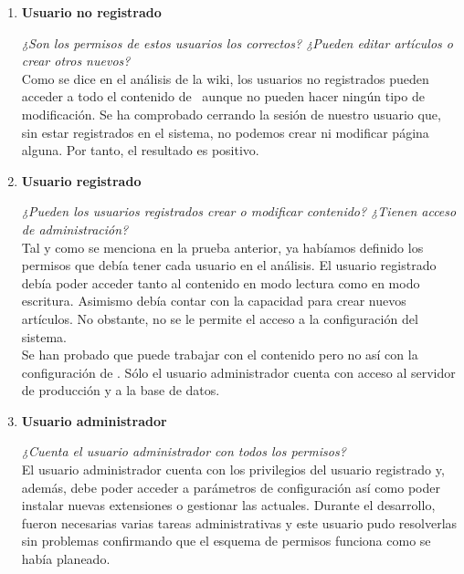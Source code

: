 \begin{enumerate}
    \item \textbf{Usuario no registrado}
    
    \textit{¿Son los permisos de estos usuarios los correctos? ¿Pueden
    editar artículos o crear otros nuevos?}\\
    
    Como se dice en el análisis de la wiki, los usuarios no registrados
    pueden acceder a todo el contenido de \wiki\ aunque no pueden hacer
    ningún tipo de modificación. Se ha comprobado cerrando la sesión de
    nuestro usuario que, sin estar registrados en el sistema, no podemos
    crear ni modificar página alguna. Por tanto, el resultado es positivo.\\
    
    \item \textbf{Usuario registrado}
    
    \textit{¿Pueden los usuarios registrados crear o modificar contenido?
    ¿Tienen acceso de administración?}\\
    
    Tal y como se menciona en la prueba anterior, ya habíamos definido
    los permisos que debía tener cada usuario en el análisis. El usuario
    registrado debía poder acceder tanto al contenido en modo lectura
    como en modo escritura. Asimismo debía contar con la capacidad
    para crear nuevos artículos. No obstante, no se le permite el acceso
    a la configuración del sistema.\\
    
    Se han probado que puede trabajar con el contenido pero no así con la
    configuración de \wiki. Sólo el usuario administrador cuenta con
    acceso al servidor de producción y a la base de datos.\\
    
    \item \textbf{Usuario administrador}
    
    \textit{¿Cuenta el usuario administrador con todos los permisos?}\\
    
    El usuario administrador cuenta con los privilegios del usuario registrado
    y, además, debe poder acceder a parámetros de configuración así como
    poder instalar nuevas extensiones o gestionar las actuales. Durante el
    desarrollo, fueron necesarias varias tareas administrativas y este usuario
    pudo resolverlas sin problemas confirmando que el esquema de permisos
    funciona como se había planeado.\\
    

\end{enumerate}
